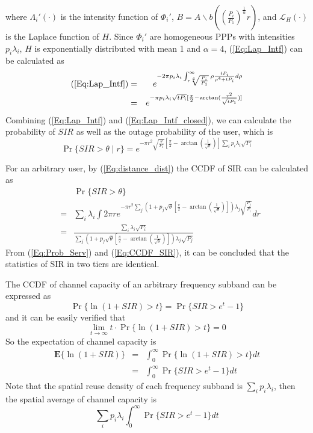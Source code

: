 \documentclass[a4paper,twocolumn]{IEEEtran}
\begin{document}
where $\Lambda_i'(\cdot)$ is the intensity function of $\Phi_i'$, $B=A\backslash b( ( \frac{P_i}{P_1} )^\frac{1}{\alpha} r)$, and $\mathcal{L}_H(\cdot)$ is the Laplace function of $H$. Since $\Phi_i'$ are homogeneous PPPs with intensities $p_i\lambda_i$, $H$ is exponentially distributed with mean 1 and $\alpha = 4$, (\ref{Eq:Lap_Intf}) can be calculated as
\begin{eqnarray}\label{Eq:Lap_Intf_closed}
(\ref{Eq:Lap_Intf})&=&e^{-2\pi p_i \lambda_i \int_{r\sqrt[4]{\frac{P_i}{P_1}}}^{\infty}\rho\frac{t P_i}{\rho^4 + t P_i}d\rho}\nonumber\\
&=&e^{-\pi p_i \lambda_i \sqrt{t P_i} [\frac{\pi}{2}-\arctan(\frac{r^2}{\sqrt{tP_1}})]} 
\end{eqnarray}
Combining (\ref{Eq:Lap_Intf}) and (\ref{Eq:Lap_Intf_closed}), we can calculate the probability of $SIR$ as well as the outage probability of the user, which is
\begin{equation}
\Pr\{SIR > \theta \mid r\} = e^{-\pi r^2 \sqrt{\frac{\theta}{P_1}} [\frac{\pi}{2}-\arctan(\frac{1}{\sqrt{\theta}})] \sum_i p_i \lambda_i \sqrt{P_i}} 
\end{equation}

For an arbitrary user, by (\ref{Eq:distance_dist}) the CCDF of SIR can be calculated as
\begin{eqnarray}\label{Eq:CCDF_SIR}
&&\Pr\{SIR > \theta \}\nonumber\\
&=&\sum_i \lambda_i \int 2\pi r e^{- \pi r^2 \sum_j (1+p_j \sqrt{\theta} [\frac{\pi}{2}-\arctan(\frac{1}{\sqrt{\theta}})]) \lambda_j \sqrt{\frac{P_j}{P_i}}} dr \nonumber\\
&=&\frac{\sum_i \lambda_i \sqrt{P_i}}{\sum_j (1+p_j \sqrt{\theta} [\frac{\pi}{2}-\arctan(\frac{1}{\sqrt{\theta}})])\lambda_j \sqrt{P_j}}
\end{eqnarray}
From (\ref{Eq:Prob_Serv}) and (\ref{Eq:CCDF_SIR}), it can be concluded that the statistics of SIR in two tiers are identical.

The CCDF of channel capacity of an arbitrary frequency subband can be expressed as
\begin{displaymath}
\Pr\{\ln(1+SIR)>t\}=\Pr\{SIR>e^t-1\}
\end{displaymath}
and it can be easily verified that
\begin{displaymath}
\lim_{t \rightarrow \infty} t \cdot \Pr\{\ln(1+SIR)>t\} = 0
\end{displaymath} 
So the expectation of channel capacity is
\begin{eqnarray}
\mathbf{E}\{\ln(1+SIR)\}&=&\int_{0}^{\infty}\Pr\{\ln(1+SIR)>t\}dt \nonumber\\
&=&\int_{0}^{\infty} \Pr\{SIR>e^t-1\} dt
\end{eqnarray}
Note that the spatial reuse density of each frequency subband is $\sum_i p_i \lambda_i $, then the spatial average of channel capacity is
\begin{equation}
 \sum_i p_i \lambda_i \int_{0}^{\infty} \Pr\{SIR>e^t-1\} dt
\end{equation}
           
\end{document}
